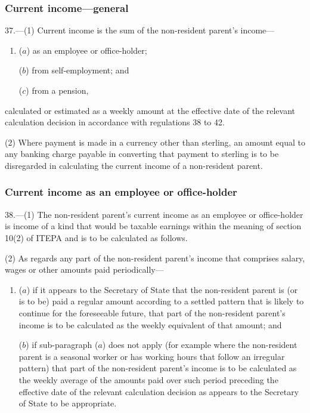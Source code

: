 \documentclass[12pt,a4paper]{article}
\begin{document}
\subsubsection[37. Current income---general]{Current income---general}

37.---(1)  Current income is the sum of the non-resident parent’s income—
\begin{enumerate}\item[]
($a$) as an employee or office-holder;

($b$) from self-employment; and

($c$) from a pension,
\end{enumerate}
calculated or estimated as a weekly amount at the effective date of the relevant calculation decision in accordance with regulations 38 to 42.

(2) Where payment is made in a currency other than sterling, an amount equal to any banking charge payable in converting that payment to sterling is to be disregarded in calculating the current income of a non-resident parent.

\subsubsection[38. Current income as an employee or office-holder]{Current income as an employee or office-holder}

38.---(1)  The non-resident parent’s current income as an employee or office-holder is income of a kind that would be taxable earnings within the meaning of section 10(2) of ITEPA and is to be calculated as follows.

(2) As regards any part of the non-resident parent’s income that comprises salary, wages or other amounts paid periodically—
\begin{enumerate}\item[]
($a$) if it appears to the Secretary of State that the non-resident parent is (or is to be) paid a regular amount according to a settled pattern that is likely to continue for the foreseeable future, that part of the non-resident parent’s income is to be calculated as the weekly equivalent of that amount; and

($b$) if sub-paragraph ($a$)  does not apply (for example where the non-resident parent is a seasonal worker or has working hours that follow an irregular pattern) that part of the non-resident parent’s income is to be calculated as the weekly average of the amounts paid over such period preceding the effective date of the relevant calculation decision as appears to the Secretary of State to be appropriate.
\end{enumerate}
\end{document}
